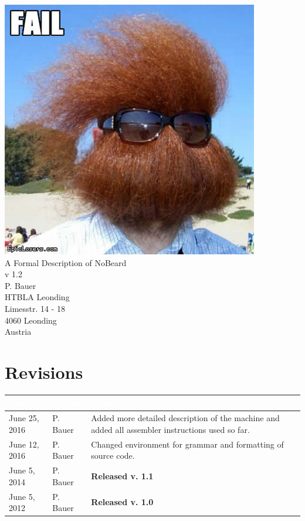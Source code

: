 \documentclass[11pt]{report}
\newcommand{\leongage}{NoBeard}
\begin{document}
\begin{titlepage}
\begin{center}
\includegraphics[scale=0.3]{no_beard_1.jpg} \\[2em]
{\Huge A Formal Description of \leongage} \\[1em]
{\large v 1.2} \\[2em]
{\Large P. Bauer} \\[1em]
HTBLA Leonding \\
Limesstr. 14 - 18 \\
4060 Leonding \\
Austria
\end{center}
\end{titlepage}

\section*{Revisions}
\begin{tabular}{|l|l|p{}|}
\hline
\cellcolor{Gray}\textcolor{White}{Date} & \cellcolor{Gray}\textcolor{White}{Author} & \cellcolor{Gray}\textcolor{White}{Change} \\ \hline
June 25, 2016 & P. Bauer & Added more detailed description of the machine and added all assembler instructions used so far.  \\ \hline
June 12, 2016 & P. Bauer & Changed environment for grammar and formatting of source code. \\ \hline
June 5, 2014 & P. Bauer & {\bf Released v. 1.1}  \\ \hline
June 5, 2012 & P. Bauer & {\bf Released v. 1.0}  \\ \hline
\end{tabular}
\end{document}
